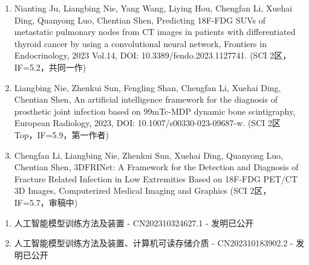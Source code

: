 \begin{publications}
    \begin{enumerate}
        \item Nianting Ju, Liangbing Nie, Yang Wang, Liying Hou, Chengfan Li, Xuehai Ding, Quanyong Luo, Chentian Shen, Predicting 18F-FDG SUVs of metastatic pulmonary nodes from CT images in patients with differentiated thyroid cancer by using a convolutional neural network, Frontiers in Endocrinology, 2023 Vol.14, DOI: 10.3389/fendo.2023.1127741. (SCI 2区，IF=5.2，共同一作)
        \item Liangbing Nie, Zhenkui Sun, Fengling Shan, Chengfan Li, Xuehai Ding, Chentian Shen, An artificial intelligence framework for the diagnosis of prosthetic joint infection based on 99mTc-MDP dynamic bone scintigraphy, European Radiology, 2023, DOI: 10.1007/s00330-023-09687-w. (SCI 2区 Top，IF=5.9，第一作者)
        \item Chengfan Li, Liangbing Nie, Zhenkui Sun, Xuehai Ding, Quanyong Luo, Chentian Shen, 3DFRINet: A Framework for the Detection and Diagnosis of Fracture Related Infection in Low Extremities Based on 18F-FDG PET/CT 3D Images, Computerized Medical Imaging and Graphics (SCI 2区，IF=5.7，审稿中)
    \end{enumerate}

    \begin{enumerate}
        \item 人工智能模型训练方法及装置 - CN202310324627.1 - 发明已公开
        \item 人工智能模型训练方法及装置、计算机可读存储介质 - CN202310183902.2 - 发明已公开
    \end{enumerate}
\end{publications}